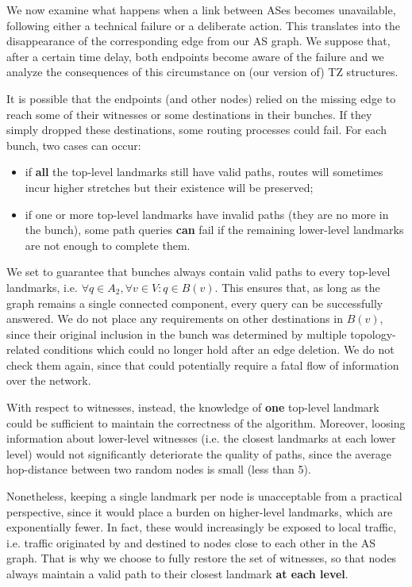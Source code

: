 \documentclass[a4paper,11pt,oneside]{report}
\begin{document}
We now examine what happens when a link between ASes becomes unavailable, following either a technical failure or a deliberate action. This translates into the disappearance of the corresponding edge from our AS graph. We suppose that, after a certain time delay, both endpoints become aware of the failure and we analyze the consequences of this circumstance on (our version of) TZ structures.

\bigskip
It is possible that the endpoints (and other nodes) relied on the missing edge to reach some of their witnesses or some destinations in their bunches. If they simply dropped these destinations, some routing processes could fail.
For each bunch, two cases can occur:
\begin{itemize}
\item if \textbf{all} the top-level landmarks still have valid paths, routes will sometimes incur higher stretches but their existence will be preserved;
\item if one or more top-level landmarks have invalid paths (they are no more in the bunch), some path queries \textbf{can} fail if the remaining lower-level landmarks are not enough to complete them.
\end{itemize}
We set to guarantee that bunches always contain valid paths to every top-level landmarks, i.e. $\forall q \in A_2, \forall v \in V:q \in B(v)$. This ensures that, as long as the graph remains a single connected component, every query can be successfully answered. We do not place any requirements on other destinations in $B(v)$, since their original inclusion in the bunch was determined by multiple topology-related conditions which could no longer hold after an edge deletion. We do not check them again, since that could potentially require a fatal flow of information over the network.

\bigskip
With respect to witnesses, instead, the knowledge of \textbf{one} top-level landmark could be sufficient to maintain the correctness of the algorithm. Moreover, loosing information about lower-level witnesses (i.e. the closest landmarks at each lower level) would not significantly deteriorate the quality of paths, since the average hop-distance between two random nodes is small (less than 5).

Nonetheless, keeping a single landmark per node is unacceptable from a practical perspective, since it would place a burden on higher-level landmarks, which are exponentially fewer. In fact, these would increasingly be exposed to local traffic, i.e. traffic originated by and destined to nodes close to each other in the AS graph. That is why we choose to fully restore the set of witnesses, so that nodes always maintain a valid path to their closest landmark \textbf{at each level}.
\end{document}
